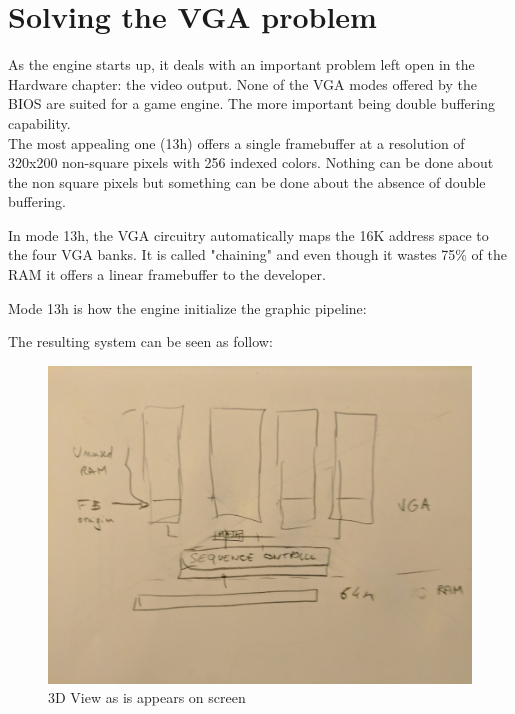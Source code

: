 \documentclass[book.tex]{subfiles}
\begin{document}
\section{Solving the VGA problem}\label{SetupPages}
As the engine starts up, it deals with an important problem left open in the Hardware chapter: the video output. None of the VGA modes offered by the BIOS are suited for a game engine. The more important being double buffering capability.\\

 The most appealing one (13h) offers a single framebuffer at a resolution of 320x200 non-square pixels with 256 indexed colors. Nothing can be done about the non square pixels but something can be done about the absence of double buffering.\\
\par
 In mode 13h, the VGA circuitry automatically maps the 16K address space to the four VGA banks. It is called "chaining" and even though it wastes 75\% of the RAM it offers a linear framebuffer to the developer.\\
 \par
 Mode 13h is how the engine initialize the graphic pipeline:\\
\par
 \begin{minipage}{\textwidth}

\end{minipage}
 \par

The resulting system can be seen as follow:\\

 \par
\begin{figure}[H]
\centering
 \includegraphics[width=\textwidth]{imgs/vga_layout/wasted_vga_ram.png}
 \caption{3D View as is appears on screen} \label{fig:vga_layout_in_3D}
 \end{figure}
\end{document}
